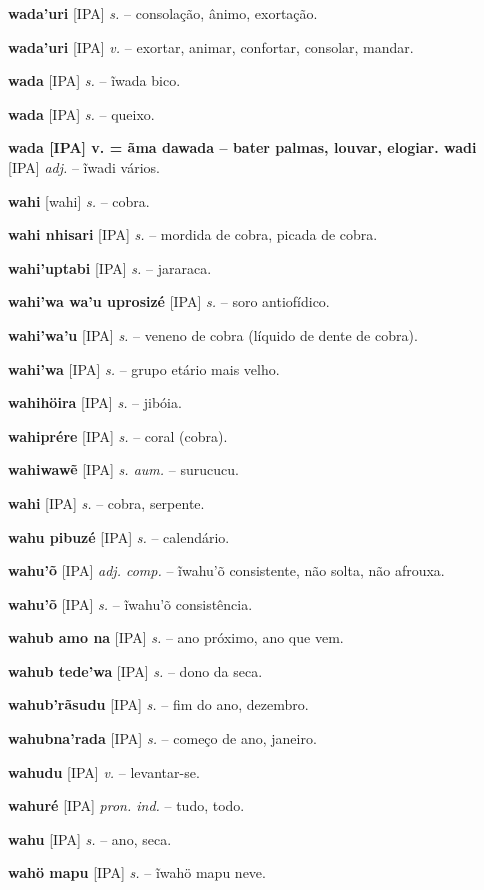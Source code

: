 \textbf{wada'uri} [IPA] \textit{s.} -- consolação, ânimo, exortação.

\textbf{wada'uri} [IPA] \textit{v.} -- exortar, animar, confortar, consolar, mandar.

\textbf{wada} [IPA] \textit{s.} -- ĩwada bico.

\textbf{wada} [IPA] \textit{s.} -- queixo.

\textbf{wada [IPA] v. = ãma dawada -- bater palmas, louvar, elogiar. wadi} [IPA] \textit{adj.} -- ĩwadi vários.

\textbf{wahi} [wahi] \textit{s.} -- cobra.

\textbf{wahi nhisari} [IPA] \textit{s.} -- mordida de cobra, picada de cobra.

\textbf{wahi'uptabi} [IPA] \textit{s.} -- jararaca.

\textbf{wahi'wa wa'u uprosizé} [IPA] \textit{s.} -- soro antiofídico.

\textbf{wahi'wa'u} [IPA] \textit{s.} -- veneno de cobra (líquido de dente de cobra).

\textbf{wahi'wa} [IPA] \textit{s.} -- grupo etário mais velho.

\textbf{wahihöira} [IPA] \textit{s.} -- jibóia.

\textbf{wahiprére} [IPA] \textit{s.} -- coral (cobra).

\textbf{wahiwawẽ} [IPA] \textit{s. aum.} -- surucucu.

\textbf{wahi} [IPA] \textit{s.} -- cobra, serpente.

\textbf{wahu pibuzé} [IPA] \textit{s.} -- calendário.

\textbf{wahu'õ} [IPA] \textit{adj. comp.} -- ĩwahu'õ consistente, não solta, não afrouxa.

\textbf{wahu'õ} [IPA] \textit{s.} -- ĩwahu'õ consistência.

\textbf{wahub amo na} [IPA] \textit{s.} -- ano próximo, ano que vem.

\textbf{wahub tede'wa} [IPA] \textit{s.} -- dono da seca.

\textbf{wahub'rãsudu} [IPA] \textit{s.} -- fim do ano, dezembro.

\textbf{wahubna'rada} [IPA] \textit{s.} -- começo de ano, janeiro.

\textbf{wahudu} [IPA] \textit{v.} -- levantar-se.

\textbf{wahuré} [IPA] \textit{pron. ind.} -- tudo, todo.

\textbf{wahu} [IPA] \textit{s.} -- ano, seca.

\textbf{wahö mapu} [IPA] \textit{s.} -- ĩwahö mapu neve.

